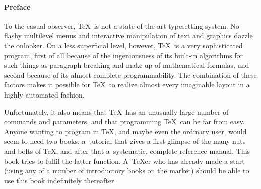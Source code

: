 \documentclass[letterpaper]{book}
\begin{document}
\pagebreak
\mark{}

\paragraph*{\bf Preface}
To the casual observer, \TeX\
is not a state-of-the-art typesetting system.
No flashy multilevel menus and interactive manipulation
of text and graphics dazzle the onlooker.
On a less superficial level, however, \TeX\ is a very sophisticated
program, first of all because of the ingeniousness of its
built-in algorithms for such things as paragraph breaking
and make-up of mathematical formulas, and
second because of its almost complete programmability.
The combination of these factors makes it possible for \TeX\
to realize almost every imaginable layout in a highly automated
fashion.

Unfortunately, it also means that \TeX\ has an
unusually large number of commands and parameters,
and that programming \TeX\ can be far from easy.
Anyone wanting to program in \TeX, and maybe
even the ordinary user, would seem to need two books:
a~tutorial that gives a first glimpse of the many
nuts and bolts of \TeX, and after that
a~systematic, complete reference manual.
This book tries to fulfil the latter function.
A~\TeX er who has already made a start
(using any of a number of introductory books
on the market)
should be able to use this book indefinitely thereafter.
\end{document}
